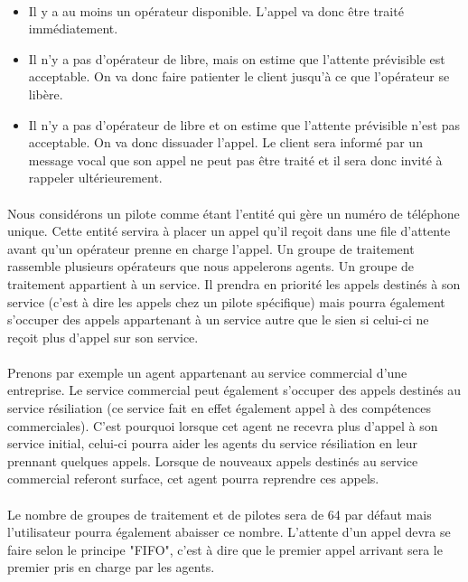 \documentclass{report}
\begin{document}
	\paragraph{}
		\begin{itemize}
			\item Il y a au moins un opérateur disponible. L'appel va donc être traité immédiatement.
			\item Il n'y a pas d'opérateur de libre, mais on estime que l'attente prévisible est acceptable. On va donc faire patienter le client jusqu'à ce que l’opérateur se libère.
			\item Il n'y a pas d’opérateur de libre et on estime que l'attente prévisible n'est pas acceptable. On va donc dissuader l'appel. Le client sera informé par un message vocal que son appel ne peut pas être traité et il sera donc invité à rappeler ultérieurement.
		\end{itemize}
	\paragraph{}
		Nous considérons un pilote comme étant l'entité qui gère un numéro de téléphone unique. Cette entité servira à placer un appel qu'il reçoit dans une file d'attente avant qu'un opérateur prenne en charge l'appel. Un groupe de traitement rassemble plusieurs opérateurs que nous appelerons agents. Un groupe de traitement appartient à un service. Il prendra en priorité les appels destinés à son service (c'est à dire les appels chez un pilote spécifique) mais pourra également s'occuper des appels appartenant à un service autre que le sien si celui-ci ne reçoit plus d'appel sur son service.
	\paragraph{}
		Prenons par exemple un agent appartenant au service commercial d'une entreprise. Le service commercial peut également s'occuper des appels destinés au service résiliation (ce service fait en effet également appel à des compétences commerciales). C'est pourquoi lorsque cet agent ne recevra plus d'appel à son service initial, celui-ci pourra aider les agents du service résiliation en leur prennant quelques appels. Lorsque de nouveaux appels destinés au service commercial referont surface, cet agent pourra reprendre ces appels.
	\paragraph{}
		Le nombre de groupes de traitement et de pilotes sera de 64 par défaut mais l'utilisateur pourra également abaisser ce nombre. L'attente d'un appel devra se faire selon le principe "FIFO", c'est à dire que le premier appel arrivant sera le premier pris en charge par les agents.
\end{document}
